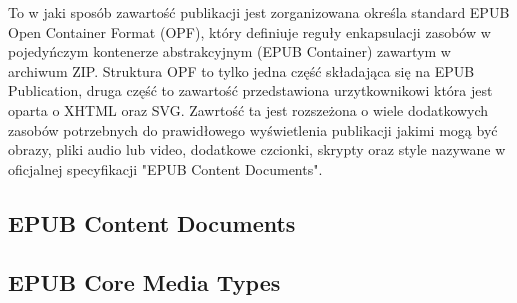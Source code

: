 To w jaki sposób zawartość publikacji jest zorganizowana określa standard EPUB Open Container Format (OPF), który definiuje reguły
enkapsulacji zasobów w pojedyńczym kontenerze abstrakcyjnym (EPUB Container) zawartym w archiwum ZIP. Struktura OPF to tylko jedna część
składająca się na EPUB Publication, druga część to zawartość przedstawiona urzytkownikowi która jest oparta o XHTML oraz SVG. Zawrtość
ta jest rozszeżona o wiele dodatkowych zasobów potrzebnych do prawidłowego wyświetlenia publikacji jakimi mogą być obrazy, pliki audio
lub video, dodatkowe czcionki, skrypty oraz style nazywane w oficjalnej specyfikacji "EPUB Content Documents".

\subsection*{EPUB Content Documents}

\subsection*{EPUB Core Media Types}

